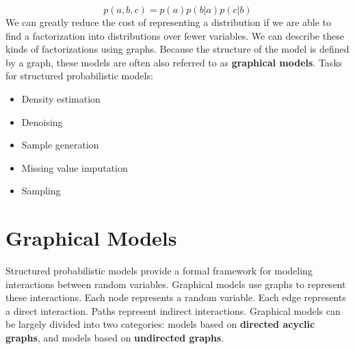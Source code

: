 \[p(a, b, c) = p(a)p(b | a)p(c | b)\]
We can greatly reduce the cost of representing a distribution if we are able to find a factorization into distributions over fewer variables. We can describe these kinds of factorizations using graphs. Because the structure of the model is defined by a graph, these models are often also referred to as \textbf{graphical models}.\newline\newline
Tasks for structured probabilistic models:
\begin{itemize}
    \item Density estimation
    \item Denoising
    \item Sample generation
    \item Missing value imputation
    \item Sampling
\end{itemize}


\section{Graphical Models}
Structured probabilistic models provide a formal framework for modeling interactions between random variables. Graphical models use graphs to represent these interactions. Each node represents a random variable. Each edge represents a direct interaction. Paths represent indirect interactions.\newline\newline
Graphical models can be largely divided into two categories: models based on \textbf{directed acyclic graphs}, and models based on \textbf{undirected graphs}.

